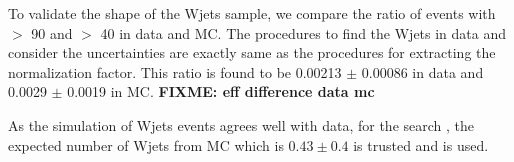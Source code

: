 To validate the shape of the Wjets sample, we compare the ratio of events with \mttwo $>$ 90 \GeV and  \mttwo $>$ 40 \GeV in data and MC.
The procedures to find the Wjets in data and consider the uncertainties are exactly same as the procedures for extracting the normalization  
factor. This ratio is found to be 0.00213 $\pm$ 0.00086 in data and  0.0029 $\pm$ 0.0019 in MC. {\bf FIXME: eff difference data mc}

As the simulation of Wjets events agrees well with data, for the search \bintwo, the expected number of Wjets from MC which is $0.43\pm0.4$ is trusted and is used.

